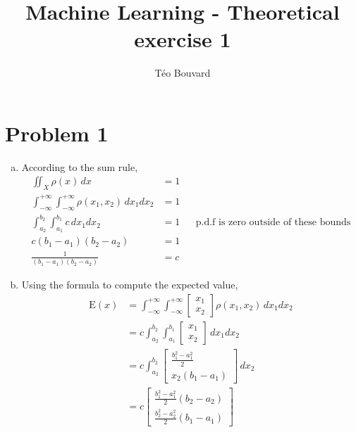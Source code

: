 \documentclass[a4paper, 10pt, twoside]{article}
\begin{document}
\title{Machine Learning - Theoretical exercise 1}
\author{T\'eo Bouvard}
\maketitle

\section*{Problem 1}
\begin{enumerate}[a)]
    \item According to the sum rule,
          \begin{align*}
              \iint_X \rho(x) \,dx                                                       & = 1                                                   \\
              \int_{-\infty}^{+\infty}\int_{-\infty}^{+\infty} \rho(x_1, x_2) \,dx_1dx_2 & = 1                                                   \\
              \int_{a_2}^{b_2}\int_{a_1}^{b_1} c \,dx_1dx_2                              & = 1 &  & \text{p.d.f is zero outside of these bounds} \\
              c(b_1-a_1)(b_2-a_2)                                                        & = 1                                                   \\
              \frac{1}{(b_1-a_1)(b_2-a_2)}                                               & = c
          \end{align*}

    \item Using the formula to compute the expected value,
          \begin{align*}
              \mathrm{E}(x) & = \int_{-\infty}^{+\infty}\int_{-\infty}^{+\infty} \begin{bmatrix} x_1 \\ x_2 \end{bmatrix}\rho(x_1, x_2) \,dx_1dx_2 \\
                            & = c \int_{a_2}^{b_2}\int_{a_1}^{b_1} \begin{bmatrix} x_1 \\ x_2 \end{bmatrix} \,dx_1dx_2                             \\
                            & = c \int_{a_2}^{b_2} \begin{bmatrix} \frac{b_1^2 - a_1^2}{2} \\ x_2(b_1-a_1) \end{bmatrix} \,dx_2                                                 \\
                            & = c\begin{bmatrix} \frac{b_1^2 - a_1^2}{2}(b_2-a_2) \\ \frac
                  {b_2^2 - a_2^2}{2}(b_1-a_1)\end{bmatrix}
          \end{align*}


\end{enumerate}
\end{document}
